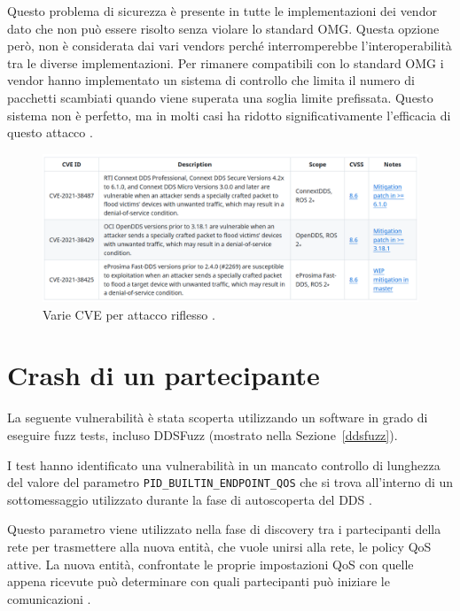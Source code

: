 Questo problema di sicurezza è presente in tutte le implementazioni 
dei vendor dato che non può essere risolto senza violare lo 
standard OMG. Questa opzione però, non è considerata dai vari 
vendors perché interromperebbe l'interoperabilità tra le 
diverse implementazioni.
Per rimanere compatibili con lo standard OMG i vendor hanno 
implementato un sistema di controllo che limita il numero 
di pacchetti scambiati quando viene superata una soglia limite
prefissata. Questo sistema non è perfetto, ma in molti casi ha 
ridotto significativamente 
l'efficacia di questo attacco \cite{mayoral2022robot}.

\begin{figure}[H]
    \centering
    \includegraphics[width=15.2cm, keepaspectratio]{img/CVErecoinnassance.png}
    \caption{Varie CVE per attacco riflesso \cite{mayoral2022robot}.}
    \label{CVErecoinnassance}
\end{figure}


\section{Crash di un partecipante}
La seguente vulnerabilità è stata scoperta utilizzando 
un software in grado di eseguire fuzz tests, 
incluso DDSFuzz (mostrato nella Sezione~\ref{ddsfuzz}).

I test hanno identificato una vulnerabilità in un mancato 
controllo di lunghezza del valore del parametro 
\texttt{PID\_BUILTIN\_ENDPOINT\_QOS} che si trova all'interno di 
un sottomessaggio utilizzato durante la fase di autoscoperta
del DDS \cite{mayoral2022robot}. 

Questo parametro viene 
utilizzato nella fase di discovery
tra i partecipanti della rete per trasmettere
alla nuova entità, che vuole unirsi alla rete, le policy
QoS attive. La nuova entità, confrontate 
le proprie impostazioni QoS con quelle appena ricevute
può determinare con quali partecipanti può iniziare le 
comunicazioni \cite{ddsrtps}.

